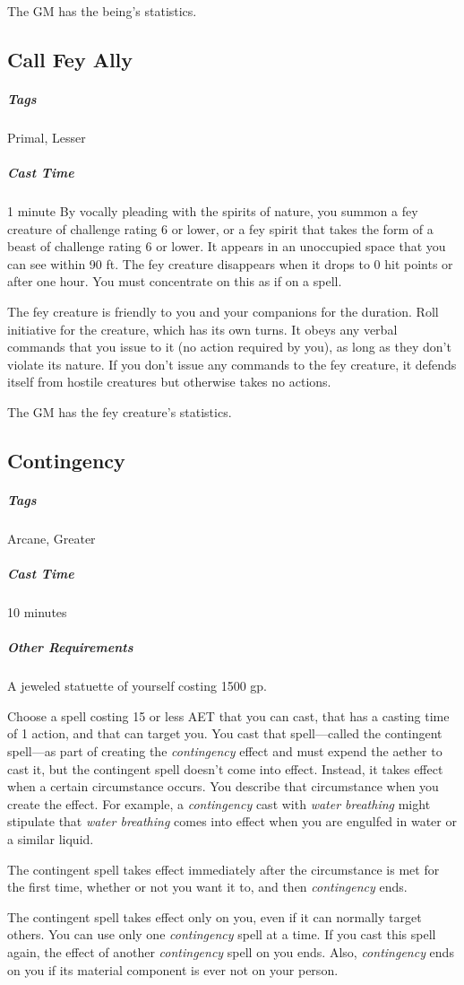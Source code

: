The GM has the being’s statistics.

\subsection{Call Fey Ally}
\subparagraph*{Tags} Primal, Lesser
\subparagraph*{Cast Time} 1 minute
By vocally pleading with the spirits of nature, you summon a fey creature of challenge rating 6 or lower, or a fey spirit that takes the form of a beast of challenge rating 6 or lower. It appears in an unoccupied space that you can see within 90 ft. The fey creature disappears when it drops to 0 hit points or after one hour. You must concentrate on this as if on a spell.

The fey creature is friendly to you and your companions for the duration. Roll initiative for the creature, which has its own turns. It obeys any verbal commands that you issue to it (no action required by you), as long as they don’t violate its nature. If you don’t issue any commands to the fey creature, it defends itself from hostile creatures but otherwise takes no actions.

The GM has the fey creature’s statistics.

\subsection{Contingency}
\subparagraph*{Tags} Arcane, Greater
\subparagraph*{Cast Time} 10 minutes
\subparagraph*{Other Requirements} A jeweled statuette of yourself costing 1500 gp.

Choose a spell costing 15 or less AET that you can cast, that has a casting time of 1 action, and that can target you. You cast that spell—called the contingent spell—as part of creating the \textit{contingency} effect and must expend the aether to cast it, but the contingent spell doesn’t come into effect. Instead, it takes effect when a certain circumstance occurs. You describe that circumstance when you create the effect. For example, a \textit{contingency} cast with \textit{water breathing} might stipulate that \textit{water breathing} comes into effect when you are engulfed in water or a similar liquid.

The contingent spell takes effect immediately after the circumstance is met for the first time, whether or not you want it to, and then \textit{contingency} ends.

The contingent spell takes effect only on you, even if it can normally target others. You can use only one \textit{contingency} spell at a time. If you cast this spell again, the effect of another \textit{contingency} spell on you ends. Also, \textit{contingency} ends on you if its material component is ever not on your person.

